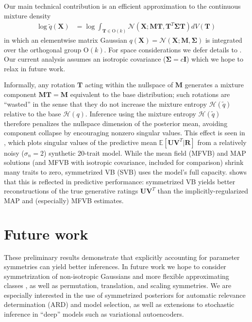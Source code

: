 \documentclass{article}
\newcommand{\N}{\mathcal{N}}
\newcommand{\E}{\mathbb{E}}
\renewcommand{\O}{\text{O}}
\renewcommand{\v}[1]{\mathbf{#1}}
\newcommand{\I}{\v{I}}
\begin{document}
\vspace{-0.5em}
Our main technical contribution is an efficient approximation to the continuous mixture density
\begin{align*}
\log \tilde{q}(\v{X}) &= \log \int_{\v{T}\in \O(k)} \N(\v{X}; \v{M}\v{T}, \v{T}^T\v{\Sigma} \v{T}) dV(\v{T})
\end{align*}
in which an elementwise matrix Gaussian $q(\v{X})=\N(\v{X}; \v{M}, \v{\Sigma})$ is
integrated over the orthogonal group $\O(k)$. For space considerations
we defer details to . Our current analysis assumes an isotropic covariance ($\v{\Sigma}=c\I$)
which we hope to relax in future work. 

Informally, any rotation $\v{T}$ acting within the nullspace of $\v{M}$
generates a mixture component $\v{M}\v{T}=\v{M}$ equivalent to the base distribution;
such rotations are ``wasted'' in the sense that they do not increase
the mixture entropy $\mathcal{H}(\tilde{q})$ relative to the base
$\mathcal{H}(q)$. Inference using the mixture entropy $\mathcal{H}(\tilde{q})$
therefore penalizes the nullspace dimension of the posterior mean, avoiding component collapse by encouraging nonzero singular values. This effect is seen in , which plots
singular values of the predictive mean $\E[\v{U}\v{V}^T | \v{R}]$ from a relatively noisy
($\sigma_n=2$) synthetic 20-trait model. While the mean field (MFVB) and MAP
solutions (and MFVB with isotropic covariance, included
for comparison) shrink many traits to zero, symmetrized VB (SVB) uses
the model's full capacity.  shows that this is
reflected in predictive performance: symmetrized VB yields better
reconstructions of the true
generative ratings $\v{U}\v{V}^T$ than the implicitly-regularized MAP
and (especially) MFVB estimates. 

\section{Future work}
\vspace{-0.5em}
These preliminary results demonstrate that explicitly accounting for
parameter symmetries can yield better inferences. In future work we
hope to consider symmetrization of non-isotropic Gaussians and
more flexible approximating classes
\citep{salimans2015markov,rezende2015variational,tran2016variational},
as well as permutation, translation, and scaling symmetries. We are
especially interested in the use of symmetrized posteriors for
automatic relevance determination (ARD) and model selection,
as well as extensions to stochastic inference in ``deep'' models
such as variational autoencoders.
\end{document}
